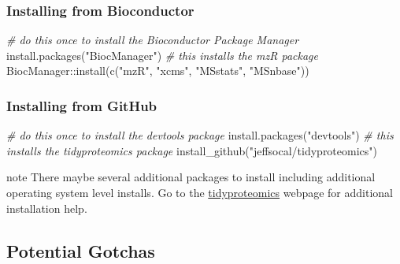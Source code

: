 \documentclass[
]{book}
\newenvironment{Shaded}{\begin{snugshade}}{\end{snugshade}}
\newcommand{\CommentTok}[1]{\textcolor[rgb]{0.56,0.35,0.01}{\textit{#1}}}
\newcommand{\FunctionTok}[1]{\textcolor[rgb]{0.00,0.00,0.00}{#1}}
\newcommand{\NormalTok}[1]{#1}
\newcommand{\SpecialCharTok}[1]{\textcolor[rgb]{0.00,0.00,0.00}{#1}}
\newcommand{\StringTok}[1]{\textcolor[rgb]{0.31,0.60,0.02}{#1}}
\begin{document}
\hypertarget{installing-from-bioconductor}{%
\subsubsection*{Installing from Bioconductor}\label{installing-from-bioconductor}}

\begin{Shaded}
\begin{Highlighting}[]
\CommentTok{\# do this once to install the Bioconductor Package Manager}
\FunctionTok{install.packages}\NormalTok{(}\StringTok{"BiocManager"}\NormalTok{)}
\CommentTok{\# this installs the mzR package}
\NormalTok{BiocManager}\SpecialCharTok{::}\FunctionTok{install}\NormalTok{(}\FunctionTok{c}\NormalTok{(}\StringTok{"mzR"}\NormalTok{, }\StringTok{"xcms"}\NormalTok{, }\StringTok{"MSstats"}\NormalTok{, }\StringTok{"MSnbase"}\NormalTok{))}
\end{Highlighting}
\end{Shaded}

\hypertarget{installing-from-github}{%
\subsubsection*{Installing from GitHub}\label{installing-from-github}}

\begin{Shaded}
\begin{Highlighting}[]
\CommentTok{\# do this once to install the devtools package }
\FunctionTok{install.packages}\NormalTok{(}\StringTok{"devtools"}\NormalTok{)}
\CommentTok{\# this installs the tidyproteomics package}
\FunctionTok{install\_github}\NormalTok{(}\StringTok{"jeffsocal/tidyproteomics"}\NormalTok{)}
\end{Highlighting}
\end{Shaded}

\begin{infobox}{note}
There maybe several additional packages to install including additional operating system level installs. Go to the \href{https://jeffsocal.github.io/tidyproteomics/}{tidyproteomics} webpage for additional installation help.

\end{infobox}

\hypertarget{potential-gotchas}{%
\subsection{Potential Gotchas}\label{potential-gotchas}}
\end{document}
